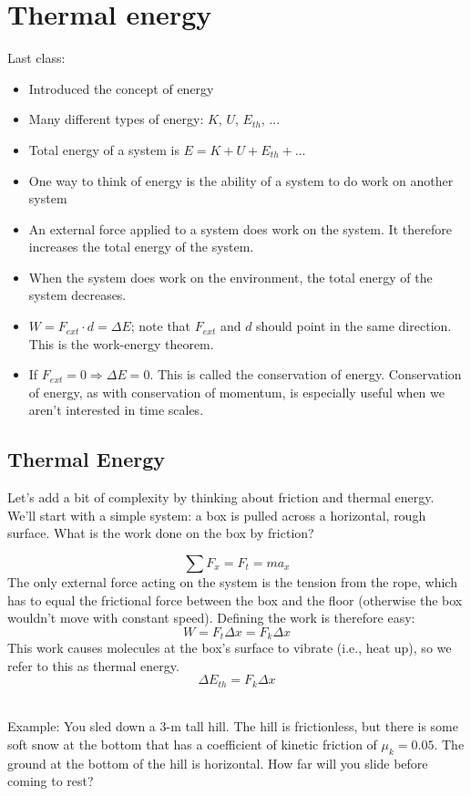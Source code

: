 \section{Thermal energy}
Last class:
\begin{itemize}
\item Introduced the concept of energy
\item Many different types of energy: $K$, $U$, $E_{th}$, $...$
\item Total energy of a system is $E=K+U+E_{th}+...$
\item One way to think of energy is the ability of a system to do work on another system
\item An external force applied to a system does work on the system. It therefore increases the total energy of the system.
\item When the system does work on the environment, the total energy of the system decreases.
\item $W=F_{ext}\cdot d=\Delta{E}$; note that $F_{ext}$ and $d$ should point in the same direction. This is the work-energy theorem.
\item If $F_{ext}=0\Rightarrow \Delta{E}=0$. This is called the conservation of energy. Conservation of energy, as with conservation of momentum, is especially useful when we aren't interested in time scales.
\end{itemize}


\subsection*{Thermal Energy}
Let's add a bit of complexity by thinking about friction and thermal energy. We'll start with a simple system: a box is pulled across a horizontal, rough surface. What is the work done on the box by friction?

$$\sum F_x=F_t=ma_x$$
The only external force acting on the system is the tension from the rope, which has to equal the frictional force between the box and the floor (otherwise the box wouldn't move with constant speed). Defining the work is therefore easy:
$$W=F_t\Delta{x}=F_k\Delta{x}$$
This work causes molecules at the box's surface to vibrate (i.e., heat up), so we refer to this as thermal energy.
$$\boxed{\Delta{E_{th}}=F_k\Delta{x}}$$

\hrulefill\\
Example: You sled down a 3-m tall hill. The hill is frictionless, but there is some soft snow at the bottom that has a coefficient of kinetic friction of $\mu_k=0.05$. The ground at the bottom of the hill is horizontal. How far will you slide before coming to rest?

